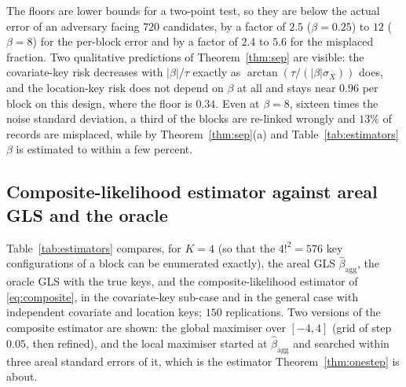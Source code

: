 \documentclass[11pt]{article}
\theoremstyle{definition}
\newcommand{\agg}{\mathrm{agg}}
\begin{document}
The floors are lower bounds for a two-point test, so they are below the actual error of an adversary facing $720$ candidates, by a factor of $2.5$ ($\beta=0.25$) to $12$ ($\beta=8$) for the per-block error and by a factor of $2.4$ to $5.6$ for the misplaced fraction. Two qualitative predictions of Theorem~\ref{thm:sep} are visible: the covariate-key risk decreases with $|\beta|/\tau$ exactly as $\arctan(\tau/(|\beta|\sigma_X))$ does, and the location-key risk does not depend on $\beta$ at all and stays near $0.96$ per block on this design, where the floor is $0.34$. Even at $\beta=8$, sixteen times the noise standard deviation, a third of the blocks are re-linked wrongly and $13\%$ of records are misplaced, while by Theorem~\ref{thm:sep}(a) and Table~\ref{tab:estimators} $\beta$ is estimated to within a few percent.

\subsection{Composite-likelihood estimator against areal GLS and the oracle}
Table~\ref{tab:estimators} compares, for $K=4$ (so that the $4!^2=576$ key configurations of a block can be enumerated exactly), the areal GLS $\hat\beta_\agg$, the oracle GLS with the true keys, and the composite-likelihood estimator of \eqref{eq:composite}, in the covariate-key sub-case and in the general case with independent covariate and location keys; $150$ replications. Two versions of the composite estimator are shown: the global maximiser over $[-4,4]$ (grid of step $0.05$, then refined), and the local maximiser started at $\hat\beta_\agg$ and searched within three areal standard errors of it, which is the estimator Theorem~\ref{thm:onestep} is about.
\end{document}
